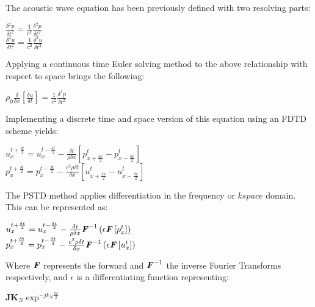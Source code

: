 The acoustic wave equation has been previously defined with two resolving parts:\\
\begin{center}
$\frac{\delta^2 p}{\delta t^2} = \frac{1}{c^2} \frac{\delta^2 p}{\delta t^2}$\\
$\frac{\delta^2 u}{\delta t^2} = \frac{1}{c^2} \frac{\delta^2 u}{\delta t^2}$\\
\end{center}
Applying a continuous time Euler solving method to the above relationship with respect to space brings the following:\\
\begin{center}
$\rho_0 \frac{\delta}{\delta x}\left[\frac{\delta u}{\delta t}\right] =\frac{1}{c^2} \frac{\delta ^2 p}{\delta t^2} $\\
\end{center}
Implementing a discrete time and space version of this equation using an FDTD scheme yields:\\
\begin{center}
$u^{t + \frac{\delta t}{2}}_{x} = u^{t - \frac{\delta t}{2}}_{x} - \frac{\delta t}{\rho \delta x} \left[p^{t}_{x + \frac{\delta x}{2}} - p^{t}_{x - \frac{\delta x}{2}}\right]$\\
$p^{t + \frac{\delta t}{2}}_{x} = p^{t - \frac{\delta t}{2}}_{x} - \frac{c^2 \rho \delta t}{\delta x} \left[u^{t}_{x + \frac{\delta x}{2}} - u^{t}_{x - \frac{\delta x}{2}}\right]$\\
\end{center}
The PSTD method applies differentiation in the frequency or $ \textit{k} space$ domain. This can be represented as:\\
\begin{center}
$u^{t + \frac{\delta t}{2}}_{x} = u^{t - \frac{\delta t}{2}}_{x} - \frac{\delta t}{\rho \delta x} \textbf{\textit{F}}^{-1}\left(\epsilon \textbf{\textit{F}}\left[p^{t}_{x}\right] \right)$\\
$p^{t + \frac{\delta t}{2}}_{x} = p^{t - \frac{\delta t}{2}}_{x} - \frac{c^2 \rho \delta t}{\delta x} \textbf{\textit{F}}^{-1}\left( \epsilon \textbf{\textit{F}} \left[ u^{t}_{x} \right] \right)$\\
\end{center}
Where $\textbf{\textit{F}}$ represents the forward and $\textbf{\textit{F}}^{-1}$ the inverse Fourier Transforms respectively, and $\epsilon$ is a differentiating function representing:\\
\begin{center}
$\textbf{JK}_N \exp^{-jk_N\frac{\delta x}{2}}$\\
\end{center}
